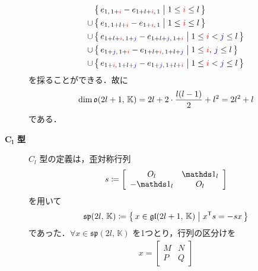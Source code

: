 \documentclass{ltjsarticle}
\theoremstyle{mystyle} %
\numberwithin{equation}{section}
\begin{document}
\begin{description}
\begin{align}
        &\bigl\{\, e_{1,\, 1 + \textcolor{red}{i}} - e_{1 + l + \textcolor{red}{i},\, 1} \bigm| 1 \le \textcolor{red}{i} \le l \,\bigr\} \\
        \cup\, &\bigl\{\, e_{1,\, 1 + l + \textcolor{red}{i}} - e_{1 + \textcolor{red}{i},\, 1} \bigm| 1 \le \textcolor{red}{i} \le l \,\bigr\} \\
        \cup\, &\bigl\{\, e_{1 + l + \textcolor{red}{i},\, 1 + \textcolor{blue}{j}} - e_{1 + l + \textcolor{blue}{j},\, 1 + \textcolor{red}{i}} \bigm| 1 \le \textcolor{red}{i} < \textcolor{blue}{j} \le l \,\bigr\} \\
        \cup\, &\bigl\{\, e_{1 + \textcolor{blue}{j},\, 1 + \textcolor{red}{i}} - e_{1 + l + \textcolor{red}{i},\, 1 + l + \textcolor{blue}{j}} \bigm| 1 \le \textcolor{red}{i},\, \textcolor{blue}{j} \le l \,\bigr\}  \\
        \cup\, &\bigl\{\, e_{1 + \textcolor{red}{i},\, 1 + l + \textcolor{blue}{j}} - e_{1 + \textcolor{blue}{j},\, 1 + l + \textcolor{red}{i}} \bigm| 1 \le \textcolor{red}{i} < \textcolor{blue}{j} \le l \,\bigr\} 
    \end{align}
    を採ることができる．故に
    \begin{align}
        \dim \mathfrak{o} (2l+1,\, \mathbb{K}) = 2l + 2 \cdot \frac{l (l-1)}{2} + l^2 = 2l^2 + l
    \end{align}
    である．
    \item[\textbf{$\bm{C_l}$ 型}] $C_l$ 型の定義は，歪対称行列
    \begin{align}
        s \coloneqq 
        \left[
            \begin{array}{cc}
                O_l &\unity_l \\ 
                -\unity_l &O_l
            \end{array}
        \right]
    \end{align}
    を用いて
    \begin{align}
        \label{eq:ex1-1-8C}
        \mathfrak{sp} (2l,\, \mathbb{K}) \coloneqq \bigl\{\, x \in \mathfrak{gl}(2l+1,\, \mathbb{K}) \bigm| x^{\mathsf{T}}s = -sx  \,\bigr\} 
    \end{align}
    であった．$\forall x \in \mathfrak{sp} (2l,\, \mathbb{K})$ を1つとり，行列の区分けを
    \begin{align}
        x = \left[
            \begin{array}{cc}
                M & N \\  
                P & Q 
            \end{array}
        \right]

\end{align}
\end{description}
\end{document}
